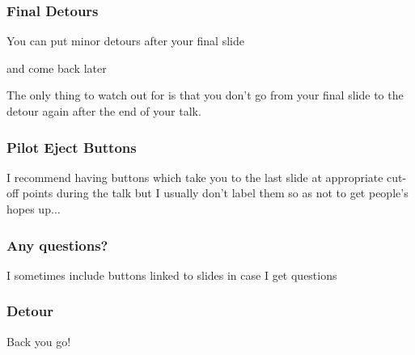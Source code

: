 \documentclass[]%
{beamer}
\begin{document}
\begin{frame}[label=final detours]
\frametitle{Final Detours}

You can put minor detours after your final slide

\hyperlink{detour<1>}{{}}

\pause
and come back later

The only thing to watch out for is that you don't go
from your final slide to the detour again after the end of your talk.

\end{frame}

\begin{frame}
\frametitle{Pilot Eject Buttons}

I recommend having buttons which take you to the last slide at appropriate cut-off points during the talk but I usually don't label them so as not to get people's hopes up$\dots$

\hfill\hyperlink{last slide<1>}{{\beamerbutton{}}}

\end{frame}


\begin{frame}[label=last slide]
\frametitle{Any questions?}

\vfill
\vfill
\pause
{}

\vfill
\vfill
\vfill
\vfill
\vfill
I sometimes include buttons linked to slides in case I get questions
\bigskip
\hyperlink{First-slide<1>}{{}}

\end{frame}

\begin{frame}[label=detour]
\frametitle{Detour}

Back you go!
\hfill\hyperlink{final detours<2>}{}


\end{frame}
\end{document}
